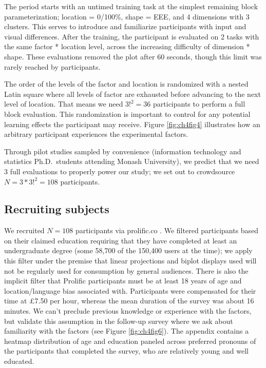 \documentclass{template/monashthesis}
\begin{document}
The period starts with an untimed training task at the simplest remaining block parameterization; location = 0/100\%, shape = EEE, and 4 dimensions with 3 clusters. This serves to introduce and familiarize participants with input and visual differences. After the training, the participant is evaluated on 2 tasks with the same factor * location level, across the increasing difficulty of dimension * shape. These evaluations removed the plot after 60 seconds, though this limit was rarely reached by participants.

The order of the levels of the factor and location is randomized with a nested Latin square where all levels of factor are exhausted before advancing to the next level of location. That means we need \(3!^2 = 36\) participants to perform a full block evaluation. This randomization is important to control for any potential learning effects the participant may receive. Figure \ref{fig:ch4fig4} illustrates how an arbitrary participant experiences the experimental factors.

Through pilot studies sampled by convenience (information technology and statistics Ph.D.~students attending Monash University), we predict that we need 3 full evaluations to properly power our study; we set out to crowdsource \(N = 3 * 3!^2 = 108\) participants.

\hypertarget{sec:subjects}{%
\subsection{Recruiting subjects}\label{sec:subjects}}

We recruited \(N = 108\) participants via prolific.co \autocite{palan_prolific_2018}. We filtered participants based on their claimed education requiring that they have completed at least an undergraduate degree (some 58,700 of the 150,400 users at the time); we apply this filter under the premise that linear projections and biplot displays used will not be regularly used for consumption by general audiences. There is also the implicit filter that Prolific participants must be at least 18 years of age and location/language bias associated with. Participants were compensated for their time at \pounds 7.50 per hour, whereas the mean duration of the survey was about 16 minutes. We can't preclude previous knowledge or experience with the factors, but validate this assumption in the follow-up survey where we ask about familiarity with the factors (see Figure \ref{fig:ch4fig6}). The appendix contains a heatmap distribution of age and education paneled across preferred pronouns of the participants that completed the survey, who are relatively young and well educated.
\end{document}
